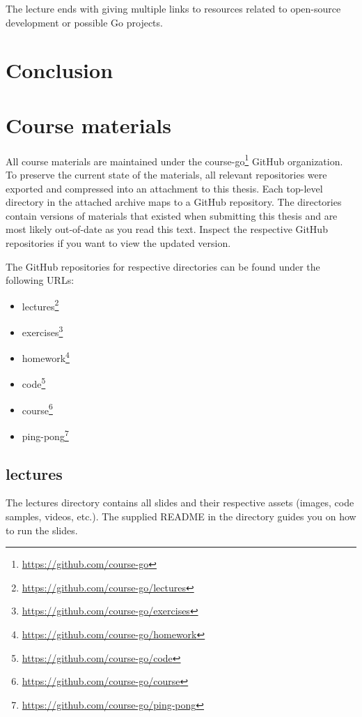 \documentclass[
  digital,
  color,
  oneside,
  nosansbold,
  nocolorbold,
  lof,
  lot,
]{fithesis4}
\begin{document}
The lecture ends with giving multiple links to resources related to open-source development or possible Go projects.

\chapter{Conclusion}

\printbibliography[heading=bibintoc]

\appendix
\chapter{Course materials}

All course materials are maintained under the course-go\footnote{\url{https://github.com/course-go}} GitHub organization. To preserve the current state of the materials, all relevant repositories were exported and compressed into an attachment to this thesis. Each top-level directory in the attached archive maps to a GitHub repository. The directories contain versions of materials that existed when submitting this thesis and are most likely out-of-date as you read this text. Inspect the respective GitHub repositories if you want to view the updated version.

The GitHub repositories for respective directories can be found under the following URLs:
\begin{itemize}
    \item lectures\footnote{\url{https://github.com/course-go/lectures}}
    \item exercises\footnote{\url{https://github.com/course-go/exercises}}
    \item homework\footnote{\url{https://github.com/course-go/homework}}
    \item code\footnote{\url{https://github.com/course-go/code}}
    \item course\footnote{\url{https://github.com/course-go/course}}
    \item ping-pong\footnote{\url{https://github.com/course-go/ping-pong}}
\end{itemize}

\section{lectures}

The lectures directory contains all slides and their respective assets (images, code samples, videos, etc.). The supplied README in the directory guides you on how to run the slides.
\end{document}
